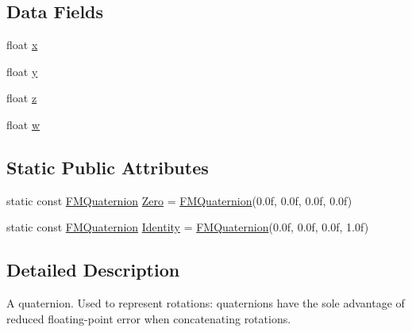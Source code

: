 \subsection*{Data Fields}
\begin{DoxyCompactItemize}
\item 
float \hyperlink{classFMQuaternion_a036c642a43fb84dc5544eb4ce0e0828d}{x}
\item 
float \hyperlink{classFMQuaternion_a996bf6bcb013dbbbe8e255c35e085f81}{y}
\item 
float \hyperlink{classFMQuaternion_a03d06578ec64cf8a4d2032c336153244}{z}
\item 
float \hyperlink{classFMQuaternion_ac60123167417258df35a27db4d3e7646}{w}
\end{DoxyCompactItemize}
\subsection*{Static Public Attributes}
\begin{DoxyCompactItemize}
\item 
static const \hyperlink{classFMQuaternion}{FMQuaternion} \hyperlink{classFMQuaternion_a5607b2bda36fbfff32f3a1677e1ebebc}{Zero} = \hyperlink{classFMQuaternion}{FMQuaternion}(0.0f, 0.0f, 0.0f, 0.0f)
\item 
static const \hyperlink{classFMQuaternion}{FMQuaternion} \hyperlink{classFMQuaternion_a7dccc8f53d6f730b27f784416a53052b}{Identity} = \hyperlink{classFMQuaternion}{FMQuaternion}(0.0f, 0.0f, 0.0f, 1.0f)
\end{DoxyCompactItemize}


\subsection{Detailed Description}
A quaternion. Used to represent rotations: quaternions have the sole advantage of reduced floating-\/point error when concatenating rotations. 

